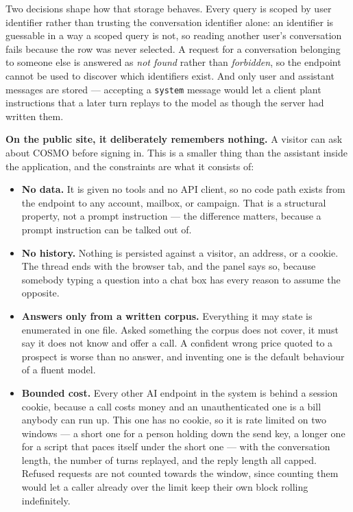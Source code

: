 \documentclass[a4paper]{article}
\begin{document}
Two decisions shape how that storage behaves. Every query is scoped by user
identifier rather than trusting the conversation identifier alone: an identifier
is guessable in a way a scoped query is not, so reading another user's
conversation fails because the row was never selected. A request for a
conversation belonging to someone else is answered as \emph{not found} rather
than \emph{forbidden}, so the endpoint cannot be used to discover which
identifiers exist. And only user and assistant messages are stored --- accepting
a \texttt{system} message would let a client plant instructions that a later
turn replays to the model as though the server had written them.

\textbf{On the public site, it deliberately remembers nothing.} A visitor can
ask about COSMO before signing in. This is a smaller thing than the assistant
inside the application, and the constraints are what it consists of:

\begin{itemize}
  \item \textbf{No data.} It is given no tools and no API client, so no code
    path exists from the endpoint to any account, mailbox, or campaign. That is
    a structural property, not a prompt instruction --- the difference matters,
    because a prompt instruction can be talked out of.
  \item \textbf{No history.} Nothing is persisted against a visitor, an
    address, or a cookie. The thread ends with the browser tab, and the panel
    says so, because somebody typing a question into a chat box has every
    reason to assume the opposite.
  \item \textbf{Answers only from a written corpus.} Everything it may state
    is enumerated in one file. Asked something the corpus does not cover, it
    must say it does not know and offer a call. A confident wrong price quoted
    to a prospect is worse than no answer, and inventing one is the default
    behaviour of a fluent model.
  \item \textbf{Bounded cost.} Every other AI endpoint in the system is behind
    a session cookie, because a call costs money and an unauthenticated one is a
    bill anybody can run up. This one has no cookie, so it is rate limited on
    two windows --- a short one for a person holding down the send key, a longer
    one for a script that paces itself under the short one --- with the
    conversation length, the number of turns replayed, and the reply length all
    capped. Refused requests are not counted towards the window, since counting
    them would let a caller already over the limit keep their own block rolling
    indefinitely.
\end{itemize}
\end{document}
